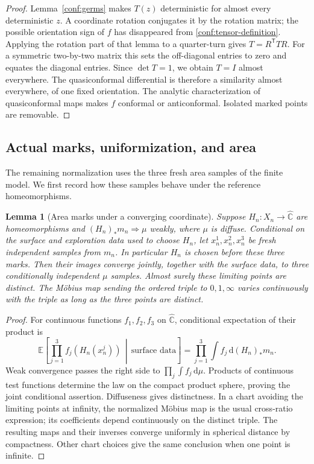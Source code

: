 \documentclass[11pt]{article}
\numberwithin{equation}{section}
\newtheorem{lemma}[theorem]{Lemma}
\theoremstyle{definition}
\theoremstyle{remark}
\newcommand{\1}{\mathbf 1}
\begin{document}
\begin{proof}
Lemma~\ref{conf:germs} makes \(T(z)\) deterministic for almost
every deterministic \(z\).  A coordinate rotation conjugates it
by the rotation matrix; the possible orientation sign of \(f\)
has disappeared from \eqref{conf:tensor-definition}.  Applying
the rotation part of that lemma to a quarter-turn gives
\(T=R^{\mathsf T}TR\).  For a symmetric two-by-two matrix this
sets the off-diagonal entries to zero and equates the diagonal
entries.  Since \(\det T=1\), we obtain \(T=I\) almost
everywhere.  The quasiconformal differential is therefore a
similarity almost everywhere, of one fixed orientation.  The
analytic characterization of quasiconformal maps
\cite[Theorem~2.5.4]{AstalaIwaniecMartin2009} makes \(f\)
conformal or anticonformal.  Isolated marked points are removable.
\end{proof}

\subsection{Actual marks, uniformization, and area}
\label{conf:normalization-subsection}

The remaining normalization uses the three fresh area samples of the
finite model.  We first record how these samples behave under the
reference homeomorphisms.

\begin{lemma}[Area marks under a converging coordinate]
\label{joint:marks}
Suppose $H_n:X_n\to\widehat{\mathbb C}$ are homeomorphisms and
$(H_n)_*m_n\Rightarrow\mu$ weakly, where $\mu$ is diffuse. Conditional
on the surface and exploration data used to choose $H_n$, let
$x_n^1,x_n^2,x_n^3$ be fresh independent samples from $m_n$. In
particular $H_n$ is chosen before these three marks. Then their images
converge jointly, together with the surface data, to three conditionally independent $\mu$ samples.
Almost surely these limiting points are distinct. The M\"obius map
sending the ordered triple to $0,1,\infty$ varies continuously with
the triple as long as the three points are distinct.
\end{lemma}

\begin{proof}
For continuous functions $f_1,f_2,f_3$ on $\widehat{\mathbb C}$, conditional
expectation of their product is
\[
 \mathbb E\!\left[\prod_{j=1}^3 f_j(H_n(x_n^j))\,
        \middle|\,\text{surface data}\right]
   =\prod_{j=1}^3\int f_j\,\mathrm d(H_n)_*m_n.
\]
Weak convergence passes the right side to
$\prod_j\int f_j\,\mathrm d\mu$. Products of continuous test functions
determine the law on the compact product sphere, proving the joint
conditional assertion. Diffuseness gives distinctness. In a chart
avoiding the limiting points at infinity, the normalized M\"obius
map is the usual cross-ratio expression; its coefficients depend
continuously on the distinct triple. The resulting maps and their
inverses converge uniformly in spherical distance by compactness.
Other chart choices give the same conclusion when one point is
infinite.
\end{proof}
\end{document}
